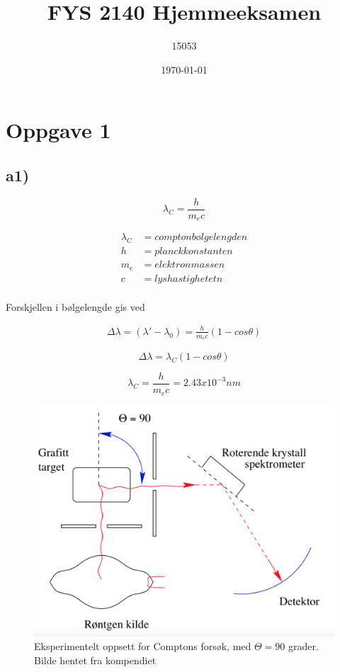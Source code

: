 \documentclass[norsk,a4paper,12pt]{article}
\title{FYS 2140 Hjemmeeksamen}
\author{15053}
\date{\today}
\begin{document}
\maketitle



\section*{Oppgave 1}

\subsection*{a1)}

\begin{equation}
\lambda_C = \frac{h}{m_ec}
\end{equation}


\begin{align*}
\lambda_C &= comptonbølgelengden \\
h &= planckkonstanten \\
m_e &= elektronmassen \\
c &= lyshastighetetn \\
\end{align*}

Forskjellen i bølgelengde gis ved 

\begin{align*}
\Delta \lambda = (\lambda' - \lambda_0) = \frac{h}{m_ec}(1-cos\theta)
\end{align*}

\begin{equation}
\Delta\lambda = \lambda_C(1-cos\theta)
\end{equation}


\begin{equation}
\lambda_C = \frac{h}{m_ec}= 2.43 x 10^{-3} nm
\end{equation}





\begin{figure}[h]
\includegraphics[scale=0.4]{compton}
\caption{Eksperimentelt oppsett for Comptons forsøk, med $\Theta =90$ grader. Bilde hentet fra kompendiet}
\label{fig:compton}
\end{figure}
\end{document}
